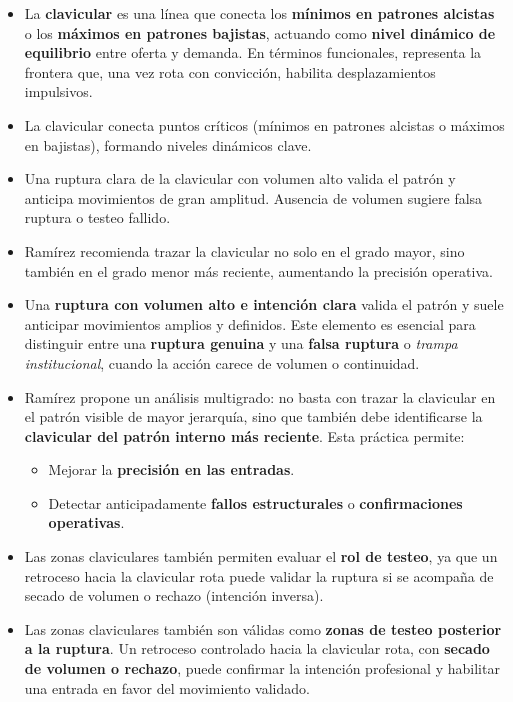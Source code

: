 \begin{itemize}
    \item La \textbf{clavicular} es una l\'inea que conecta los \textbf{m\'inimos en patrones alcistas} o los \textbf{m\'aximos en patrones bajistas}, actuando como \textbf{nivel din\'amico de equilibrio} entre oferta y demanda. En t\'erminos funcionales, representa la frontera que, una vez rota con convicci\'on, habilita desplazamientos impulsivos.

    \item La clavicular conecta puntos cr\'iticos (m\'inimos en patrones alcistas o m\'aximos en bajistas), formando niveles din\'amicos clave.  
    \item Una ruptura clara de la clavicular con volumen alto valida el patr\'on y anticipa movimientos de gran amplitud. Ausencia de volumen sugiere falsa ruptura o testeo fallido.    
    \item Ram\'irez recomienda trazar la clavicular no solo en el grado mayor, sino tambi\'en en el grado menor m\'as reciente, aumentando la precisi\'on operativa.
    \item Una \textbf{ruptura con volumen alto e intenci\'on clara} valida el patr\'on y suele anticipar movimientos amplios y definidos. Este elemento es esencial para distinguir entre una \textbf{ruptura genuina} y una \textbf{falsa ruptura} o \textit{trampa institucional}, cuando la acci\'on carece de volumen o continuidad.
    \item Ram\'irez propone un an\'alisis multigrado: no basta con trazar la clavicular en el patr\'on visible de mayor jerarqu\'ia, sino que tambi\'en debe identificarse la \textbf{clavicular del patr\'on interno m\'as reciente}. Esta pr\'actica permite:
    \begin{itemize}
        \item Mejorar la \textbf{precisi\'on en las entradas}.
        \item Detectar anticipadamente \textbf{fallos estructurales} o \textbf{confirmaciones operativas}.
    \end{itemize}
    \item Las zonas claviculares tambi\'en permiten evaluar el \textbf{rol de testeo}, ya que un retroceso hacia la clavicular rota puede validar la ruptura si se acompa\~na de secado de volumen o rechazo (intenci\'on inversa).
    \item Las zonas claviculares tambi\'en son v\'alidas como \textbf{zonas de testeo posterior a la ruptura}. Un retroceso controlado hacia la clavicular rota, con \textbf{secado de volumen o rechazo}, puede confirmar la intenci\'on profesional y habilitar una entrada en favor del movimiento validado.
\end{itemize}

